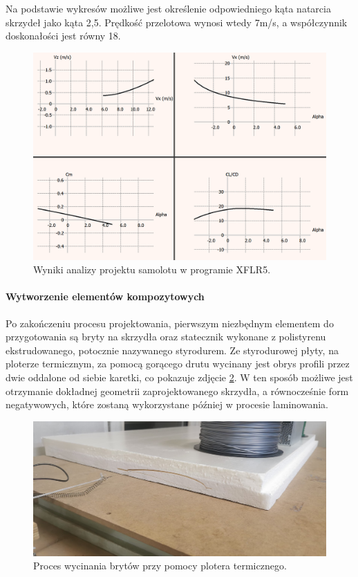 \documentclass[12pt, a4paper]{article}
\begin{document}
Na podstawie wykresów możliwe jest określenie odpowiedniego kąta natarcia skrzydeł jako kąta 2,5\textdegree. Prędkość przelotowa wynosi wtedy 7m/s, a współczynnik doskonałości jest równy 18.

\begin{figure}[ht]
    \centering
    \includegraphics[width=1\textwidth]{wykresy}
    \caption{Wyniki analizy projektu samolotu w programie XFLR5.}
    \label{fig:wykresy}
\end{figure}

\FloatBarrier
\paragraph{Wytworzenie elementów kompozytowych}\mbox{}

Po zakończeniu procesu projektowania, pierwszym niezbędnym elementem do przygotowania są bryty na skrzydła oraz statecznik wykonane z polistyrenu ekstrudowanego, potocznie nazywanego styrodurem. Ze styrodurowej płyty, na ploterze termicznym, za pomocą gorącego drutu wycinany jest obrys profili przez dwie oddalone od siebie karetki, co pokazuje zdjęcie \ref{fig:ploter}. W ten sposób możliwe jest otrzymanie dokładnej geometrii zaprojektowanego skrzydła, a równocześnie form negatywowych, które zostaną wykorzystane później w procesie laminowania.

\begin{figure}[ht]
    \centering
    \includegraphics[width=1\textwidth]{budowa5}
    \caption{Proces wycinania brytów przy pomocy plotera termicznego.}
    \label{fig:ploter}
\end{figure}
 
\end{document}

